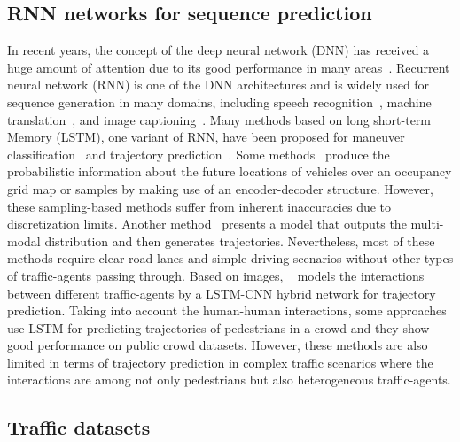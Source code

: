 \documentclass[letterpaper]{article} \usepackage{aaai19}  \usepackage{times}  \usepackage{helvet}  \usepackage{courier}  \usepackage{url}  \usepackage{graphicx}  \usepackage{amsmath}
\begin{document}
\subsection{RNN networks for sequence prediction}
In recent years, the concept of the deep neural network (DNN) has received a huge amount of attention due to its good performance in many areas~\cite{goodfellow2016deep}. Recurrent neural network (RNN) is one of the DNN architectures and is widely used for sequence generation in many domains, including speech recognition~\cite{graves2014towards}, machine translation~\cite{chung2015recurrent}, and image captioning~\cite{vinyals2015show}. Many methods based on long short-term Memory (LSTM), one variant of RNN, have been proposed for maneuver classification~\cite{khosroshahi2017learning} and trajectory prediction~\cite{altche2017lstm}. Some methods~\cite{kim2017probabilistic,park2018sequence,lee2017desire} produce the probabilistic information about the future locations of vehicles over an occupancy grid map or samples by making use of an encoder-decoder structure. However, these sampling-based methods suffer from inherent inaccuracies due to discretization limits. Another method~\cite{deo2018multi} presents a model that outputs the multi-modal distribution and then generates trajectories. Nevertheless, most of these methods require clear road lanes and simple driving scenarios without other types of traffic-agents passing through. Based on images, ~\cite{chandra2018traPHic} models the interactions between different traffic-agents by a LSTM-CNN hybrid network for trajectory prediction. Taking into account the human-human interactions, some approaches~\cite{alahi2016social,gupta2018social,vemula2017social} use LSTM for predicting trajectories of pedestrians in a crowd and they show good performance on public crowd datasets. However, these methods are also limited in terms of trajectory prediction in complex traffic scenarios where the interactions are among not only pedestrians but also heterogeneous traffic-agents. 



\subsection{Traffic datasets}
\end{document}
